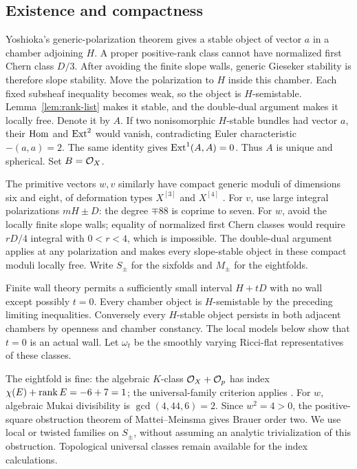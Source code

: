 \subsection{Existence and compactness}
Yoshioka's generic-polarization theorem
\cite[Theorem~0.1]{yoshioka99} gives a stable object of vector
\(a\) in a chamber adjoining \(H\).
A proper positive-rank class cannot have normalized first Chern
class \(D/3\). After avoiding the finite slope walls, generic
Gieseker stability is therefore slope stability.
Move the polarization to \(H\) inside this chamber. Each fixed
subsheaf inequality becomes weak, so the object is \(H\)-semistable.
Lemma~\ref{lem:rank-list} makes it stable, and the double-dual
argument makes it locally free. Denote it by \(A\).
If two nonisomorphic \(H\)-stable bundles had vector \(a\), their
\(\operatorname{Hom}\) and \(\operatorname{Ext}^2\) would vanish, contradicting Euler
characteristic \(-(a,a)=2\). The same identity gives
\(\operatorname{Ext}^1(A,A)=0\). Thus \(A\) is unique and spherical.
Set \(B=\mathcal O_X\).

The primitive vectors \(w,v\) similarly have compact generic
moduli of dimensions six and eight, of deformation types
\(X^{[3]}\) and \(X^{[4]}\)
\cite[Appendix, Theorem~8.1]{yoshioka01}.
For \(v\), use large integral polarizations \(mH\pm D\):
the degree \(\mp88\) is coprime to seven.
For \(w\), avoid the locally finite slope walls; equality of
normalized first Chern classes would require \(rD/4\) integral
with \(0<r<4\), which is impossible.
The double-dual argument applies at any polarization and makes
every slope-stable object in these compact moduli locally free.
Write \(S_\pm\) for the sixfolds and \(M_\pm\) for the eightfolds.

Finite wall theory \cite[Theorem~6.6]{grebtoma} permits a sufficiently
small interval \(H+tD\) with no wall except possibly \(t=0\).
Every chamber object is \(H\)-semistable by the preceding limiting
inequalities. Conversely every \(H\)-stable object persists in both
adjacent chambers by openness and chamber constancy.
The local models below show that \(t=0\) is an actual wall.
Let \(\omega_t\) be the smoothly varying Ricci-flat representatives
of these classes.

The eightfold is fine: the algebraic \(K\)-class
\(\mathcal O_X+\mathcal O_p\) has index \(\chi(E)+\operatorname{rank} E=-6+7=1\);
the universal-family criterion applies
\cite[Theorem~4.6.5]{huybrechtslehn}.
For \(w\), algebraic Mukai divisibility is
\(\gcd(4,44,6)=2\). Since \(w^2=4>0\), the positive-square
obstruction theorem of Mattei--Meinsma \cite{matteimeinsma}
gives Brauer order two. We use local or twisted families on
\(S_\pm\), without assuming an analytic trivialization of this
obstruction. Topological universal classes remain available for
the index calculations.


